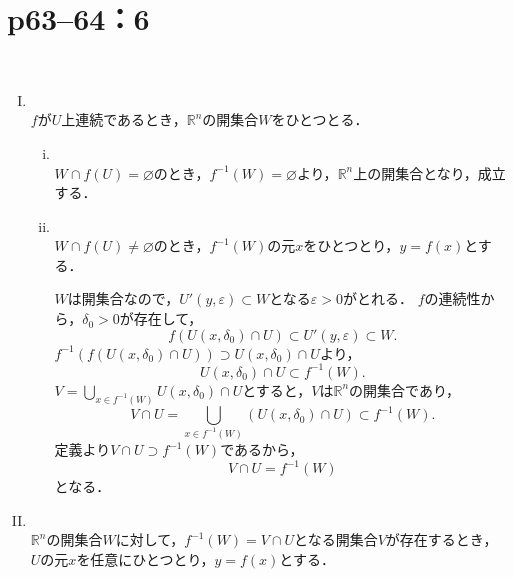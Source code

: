 \section*{p63--64：6} \label{p63--64：6}
\begin{tproof} \mbox{　}
    \begin{enumerate}[(I)]
        \item \mbox{} \\
              $f$が$U$上連続であるとき，$\mathbb{R}^n$の開集合$W$をひとつとる．
              \begin{enumerate}[(i)]
                  \item \mbox{} \\
                        $W \cap f(U) = \varnothing$のとき，$f^{-1} (W) = \varnothing$より，$\mathbb{R}^n$上の開集合となり，成立する．
                  \item \mbox{} \\
                        $W \cap f(U) \ne \varnothing$のとき，$f^{-1} (W)$の元$x$をひとつとり，$y=f(x)$とする．

                        $W$は開集合なので，$U'(y,\varepsilon) \subset W$となる$\varepsilon >0$がとれる．
                        $f$の連続性から，$\delta_0 >0$が存在して，
                        \[
                            f(U(x,\delta_0) \cap U) \subset U'(y,\varepsilon) \subset W.
                        \]
                        $f^{-1} (f(U(x,\delta_0) \cap U)) \supset U(x,\delta_0) \cap U$より，
                        \[
                            U(x,\delta_0) \cap U \subset f^{-1} (W).
                        \]
                        $V = \bigcup_{x \in f^{-1}(W)} U(x,\delta_0) \cap U$とすると，$V$は$\mathbb{R}^n$の開集合であり，
                        \[
                            V \cap U = \bigcup_{x \in f^{-1}(W)} (U(x,\delta_0) \cap U)  \subset f^{-1} (W).
                        \]
                        定義より$V \cap U \supset f^{-1} (W)$であるから，
                        \[
                            V \cap U = f^{-1} (W)
                        \]
                        となる．
              \end{enumerate}
        \item \mbox{} \\
              $\mathbb{R}^n$の開集合$W$に対して，$f^{-1}(W)=V \cap U$となる開集合$V$が存在するとき，
              $U$の元$x$を任意にひとつとり，$y=f(x)$とする．


\end{enumerate}
\end{tproof}
